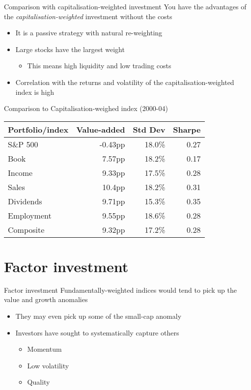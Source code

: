 \documentclass[14pt,xcolor=pdftex,dvipsnames,table]{beamer}\usepackage[]{graphicx}\usepackage[]{color}
\begin{document}
\begin{frame}{Comparison with capitalisation-weighted investment}
You have the advantages of the \emph{capitalisation-weighted} investment without the costs
\begin{itemize}[<+-| alert@+>]
\pause
\item It is a passive strategy with natural re-weighting
\item Large stocks have the largest weight
\begin{itemize}
\item This means high liquidity and low trading costs
\end{itemize}
\item Correlation with the returns and volatility of the capitalisation-weighted index is high
\end{itemize}
\end{frame}

\begin{frame}{Comparison to Capitalisation-weighed index (2000-04)}
\begin{table}
\begin{center}
\begin{tabular}{l r r r}
\textbf{Portfolio/index} & \textbf{Value-added} & \textbf{Std Dev} &  \textbf{Sharpe}\\
\hline
S\&P 500 & -0.43pp & 18.0\%& 0.27 \\
Book &      7.57pp&  18.2\%& 0.17\\
Income &    9.33pp&  17.5\%& 0.28 \\
Sales &     10.4pp&  18.2\%& 0.31 \\
Dividends & 9.71pp&  15.3\%& 0.35 \\
Employment & 9.55pp& 18.6\%& 0.28\\
Composite &  9.32pp& 17.2\%& 0.28 
\end{tabular}
\end{center}
\end{table}
\end{frame}

\section{Factor investment}
\begin{frame}{Factor investment}
Fundamentally-weighted indices would tend to pick up the value and growth anomalies
\begin{itemize}[<+-| alert@+>]
\pause
\item They may even pick up some of the small-cap anomaly
\item Investors have sought to systematically capture others
\begin{itemize}
\item Momentum
\item Low volatility 
\item Quality
\end{itemize}
\end{itemize}
\end{frame}
\end{document}
